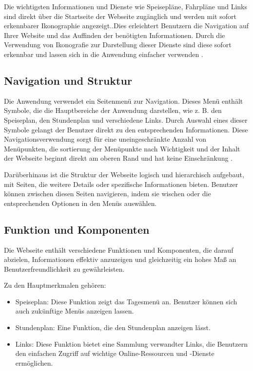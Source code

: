 Die wichtigsten Informationen und Dienste wie Speisepläne, Fahrpläne und Links sind direkt über die Startseite der Webseite zugänglich und werden mit sofort erkennbarer Ikonographie angezeigt..Dies erleichtert Benutzern die Navigation auf Ihrer Website und das Auffinden der benötigten Informationen. Durch die Verwendung von Ikonografie zur Darstellung dieser Dienste sind diese sofort erkennbar und lassen sich in die Anwendung einfacher verwenden \cite{99designs}. 

\subsection{Navigation und Struktur}
Die Anwendung verwendet ein Seitenmenü zur Navigation. Dieses Menü enthält Symbole, die die Hauptbereiche der Anwendung darstellen, wie z. B. den Speiseplan, den Stundenplan und verschiedene Links. Durch Auswahl eines dieser Symbole gelangt der Benutzer direkt zu den entsprechenden Informationen. Diese Navigationsverwendung sorgt für eine uneingeschränkte Anzahl von Menüpunkten, die sortierung der Menüpunkte nach Wichtigkeit und der Inhalt der Webseite beginnt direkt am oberen Rand und hat keine Einschränkung \cite{eology2023}.

 Darüberhinaus ist die Struktur der Webseite logisch und hierarchisch aufgebaut, mit Seiten, die weitere Details oder spezifische Informationen bieten. Benutzer können zwischen diesen Seiten navigieren, indem sie wischen oder die entsprechenden Optionen in den Menüs auswählen.

\subsection{Funktion und Komponenten}
Die Webseite enthält verschiedene Funktionen und Komponenten, die darauf abzielen, Informationen effektiv anzuzeigen und gleichzeitig ein hohes Maß an Benutzerfreundlichkeit zu gewährleisten.

Zu den Hauptmerkmalen gehören: 
\begin{itemize}
	\item Speiseplan: Diese Funktion zeigt das Tagesmenü an. Benutzer können sich auch zukünftige Menüs anzeigen lassen.
	\item Stundenplan: Eine Funktion, die den Stundenplan anzeigen lässt.
	\item Links: Diese Funktion bietet eine Sammlung verwandter Links, die Benutzern den einfachen Zugriff auf wichtige Online-Ressourcen und -Dienste ermöglichen.
\end{itemize}

